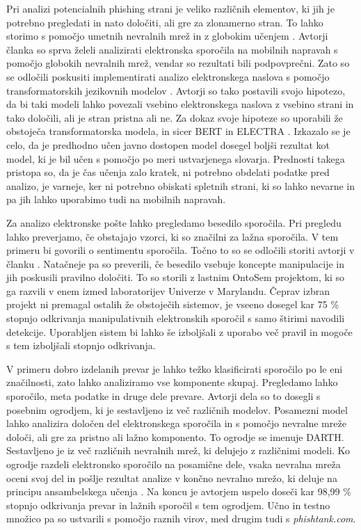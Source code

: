 \documentclass[sigconf,nonacm]{acmart}
\begin{document}
Pri analizi potencialnih phishing \cite{rekouche2011early} strani je veliko različnih elementov, ki jih je potrebno pregledati in nato določiti, ali gre za zlonamerno stran. To lahko storimo s pomočjo umetnih nevralnih mrež \cite{Zou2009} in z globokim učenjem \cite{lecun2015deep}. Avtorji članka \cite{HAYNES2021127} so sprva želeli analizirati elektronska sporočila na mobilnih napravah s pomočjo globokih nevralnih mrež, vendar so rezultati bili podpovprečni. Zato so se odločili poskusiti implementirati analizo elektronskega naslova s pomočjo transformatorskih jezikovnih modelov \cite{9222960}. Avtorji so tako postavili svojo hipotezo, da bi taki modeli lahko povezali vsebino elektronskega naslova z vsebino strani in tako določili, ali je stran pristna ali ne.  Za dokaz svoje hipoteze so uporabili že obstoječa transformatorska modela, in sicer BERT \cite{devlin2018bert} in ELECTRA \cite{clark2020electra}. Izkazalo se je celo, da je predhodno učen javno dostopen model dosegel boljši rezultat kot model, ki je bil učen s pomočjo po meri ustvarjenega slovarja. Prednosti takega pristopa so, da je čas učenja zalo kratek, ni potrebno obdelati podatke pred analizo, je varneje, ker ni potrebno obiskati spletnih strani, ki so lahko nevarne in pa jih lahko uporabimo tudi na mobilnih napravah. 

Za analizo elektronske pošte lahko pregledamo besedilo sporočila. Pri pregledu lahko preverjamo, če obstajajo vzorci, ki so značilni za lažna sporočila. V tem primeru bi govorili o sentimentu sporočila. Točno to so se odločili storiti avtorji v članku \cite{stone2007ebids}. Natačneje pa so preverili, če besedilo vsebuje koncepte manipulacije in jih poskusili pravilno določiti. To so storili z lastnim OntoSem projektom, ki so ga razvili v enem izmed laboratorijev Univerze v Marylandu. Čeprav izbran projekt ni premagal ostalih že obstoječih sistemov, je vseeno dosegel kar 75 \% stopnjo odkrivanja manipulativnih elektronskih sporočil s samo štirimi navodili detekcije. Uporabljen sistem bi lahko še izboljšali z uporabo več pravil in mogoče s tem izboljšali stopnjo odkrivanja. 

V primeru dobro izdelanih prevar je lahko težko klasificirati sporočilo po le eni značilnosti, zato lahko analiziramo vse komponente skupaj. Pregledamo lahko sporočilo, meta podatke in druge dele prevare. Avtorji dela \cite{mittal2022phishing} so to dosegli s posebnim ogrodjem, ki je sestavljeno iz več različnih modelov. Posamezni model lahko analizira določen del elektronskega sporočila in s pomočjo nevralne mreže določi, ali gre za pristno ali lažno komponento. To ogrodje se imenuje DARTH. Sestavljeno je iz več različnih nevralnih mrež, ki delujejo z različnimi modeli. Ko ogrodje razdeli elektronsko sporočilo na posamične dele, vsaka nevralna mreža oceni svoj del in pošlje rezultat analize v končno nevralno mrežo, ki deluje na principu ansambelskega učenja \cite{682375}. Na koncu je avtorjem uspelo doseči kar 98,99 \% stopnjo odkrivanja prevar in lažnih sporočil s tem ogrodjem. Učno in testno množico pa so ustvarili s pomočjo raznih virov, med drugim tudi s \emph{phishtank.com}.
\end{document}
